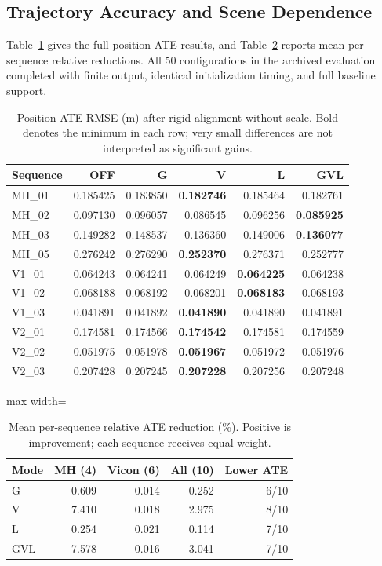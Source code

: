 \documentclass[a4paper,runningheads,twocolumn]{llncs}
\begin{document}
\subsection{Trajectory Accuracy and Scene Dependence}
Table~\ref{tab:ate} gives the full position ATE results, and Table~\ref{tab:summary} reports mean per-sequence relative reductions. All 50 configurations in the archived evaluation completed with finite output, identical initialization timing, and full baseline support.
\begin{table}[t]
\caption{Position ATE RMSE (m) after rigid alignment without scale. Bold denotes the minimum in each row; very small differences are not interpreted as significant gains.}\label{tab:ate}
\centering\small
\begin{tabular}{lrrrrr}
\toprule
Sequence & OFF & G & V & L & GVL \\
\midrule
MH\_01 & 0.185425 & 0.183850 & \textbf{0.182746} & 0.185464 & 0.182761 \\
MH\_02 & 0.097130 & 0.096057 & 0.086545 & 0.096256 & \textbf{0.085925} \\
MH\_03 & 0.149282 & 0.148537 & 0.136360 & 0.149006 & \textbf{0.136077} \\
MH\_05 & 0.276242 & 0.276290 & \textbf{0.252370} & 0.276371 & 0.252777 \\
V1\_01 & 0.064243 & 0.064241 & 0.064249 & \textbf{0.064225} & 0.064238 \\
V1\_02 & 0.068188 & 0.068192 & 0.068201 & \textbf{0.068183} & 0.068193 \\
V1\_03 & 0.041891 & 0.041892 & \textbf{0.041890} & 0.041890 & 0.041891 \\
V2\_01 & 0.174581 & 0.174566 & \textbf{0.174542} & 0.174581 & 0.174559 \\
V2\_02 & 0.051975 & 0.051978 & \textbf{0.051967} & 0.051972 & 0.051976 \\
V2\_03 & 0.207428 & 0.207245 & \textbf{0.207228} & 0.207256 & 0.207248 \\
\bottomrule
\end{tabular}
\end{table}
\begin{table}[tb]
\caption{Mean per-sequence relative ATE reduction (\%). Positive is improvement; each sequence receives equal weight.}\label{tab:summary}
\centering\small
\begin{adjustbox}{max width=\columnwidth}
\begin{tabular}{lrrrr}
\toprule
Mode & MH (4) & Vicon (6) & All (10) & Lower ATE \\
\midrule
G & 0.609 & 0.014 & 0.252 & 6/10 \\
V & 7.410 & 0.018 & 2.975 & 8/10 \\
L & 0.254 & 0.021 & 0.114 & 7/10 \\
GVL & 7.578 & 0.016 & 3.041 & 7/10 \\
\bottomrule
\end{tabular}
\end{adjustbox}
\end{table}
\end{document}
